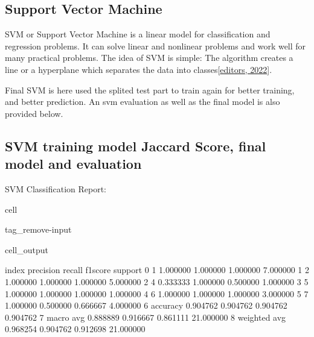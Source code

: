 \documentclass[letterpaper,10pt,english]{jupyterBook}
\begin{document}
\subsection{Support Vector Machine}
\label{\detokenize{analysis:support-vector-machine}}
\sphinxAtStartPar
SVM or Support Vector Machine is a linear model for classification and regression problems. It can solve linear and non\sphinxhyphen{}linear problems and work well for many practical problems. The idea of SVM is simple: The algorithm creates a line or a hyperplane which separates the data into classes{[}\hyperlink{cite.references:id6}{editors, 2022}{]}.

\sphinxAtStartPar
Final SVM is here used the splited test part to train again for better training, and better prediction. An svm evaluation as well as the final model is also provided below.


\subsection{SVM training model Jaccard Score, final model and evaluation}
\label{\detokenize{analysis:svm-training-model-jaccard-score-final-model-and-evaluation}}
\sphinxAtStartPar
SVM Classification Report:

\begin{sphinxuseclass}{cell}
\begin{sphinxuseclass}{tag_remove-input}\begin{sphinxVerbatimOutput}

\begin{sphinxuseclass}{cell_output}
\begin{sphinxVerbatim}[commandchars=\\\{\}]
          index  precision    recall  f1\PYGZhy{}score    support
0             1   1.000000  1.000000  1.000000   7.000000
1             2   1.000000  1.000000  1.000000   5.000000
2             4   0.333333  1.000000  0.500000   1.000000
3             5   1.000000  1.000000  1.000000   1.000000
4             6   1.000000  1.000000  1.000000   3.000000
5             7   1.000000  0.500000  0.666667   4.000000
6      accuracy   0.904762  0.904762  0.904762   0.904762
7     macro avg   0.888889  0.916667  0.861111  21.000000
8  weighted avg   0.968254  0.904762  0.912698  21.000000
\end{sphinxVerbatim}

\end{sphinxuseclass}\end{sphinxVerbatimOutput}

\end{sphinxuseclass}
\end{sphinxuseclass}
\end{document}
